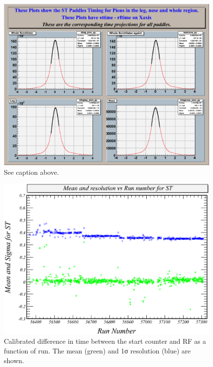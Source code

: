 \begin{figure}[htbp]\begin{center}
\includegraphics[width=0.6\columnwidth]{figures/calib/st/Timing_pad_3.eps}
\caption[]{\label{fig:calib.st.timepion.region}See caption above.}
\end{center}\end{figure}

\begin{figure}[htbp]\begin{center}
\includegraphics[width=0.65\columnwidth]{figures/calib/st/STmeanandres_v5.eps}
\caption[]{\label{fig:calib.st.runbyrun}Calibrated difference in time between the start counter and RF as a function of run. The mean (green) and 1σ resolution (blue) are shown.}
\end{center}\end{figure}

\FloatBarrier



